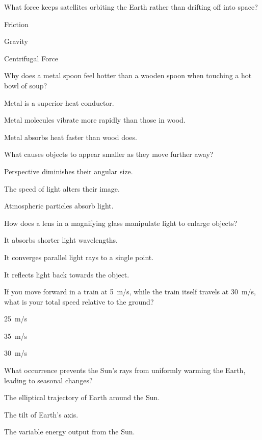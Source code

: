 \begin{enhancedmcq}{What force keeps satellites orbiting the Earth rather than drifting off into space?}
\item Friction
\item Gravity
\item Centrifugal Force

\end{enhancedmcq}
\begin{enhancedmcq}{Why does a metal spoon feel hotter than a wooden spoon when touching a hot bowl of soup?}
\item Metal is a superior heat conductor.
\item Metal molecules vibrate more rapidly than those in wood.
\item Metal absorbs heat faster than wood does.

\end{enhancedmcq}
\begin{enhancedmcq}{What causes objects to appear smaller as they move further away?}
\item Perspective diminishes their angular size.
\item The speed of light alters their image.
\item Atmospheric particles absorb light.

\end{enhancedmcq}
\begin{enhancedmcq}{How does a lens in a magnifying glass manipulate light to enlarge objects?}
\item It absorbs shorter light wavelengths.
\item It converges parallel light rays to a single point.
\item It reflects light back towards the object.

\end{enhancedmcq}
\begin{enhancedmcq}{If you move forward in a train at 5 m/s, while the train itself travels at 30 m/s, what is your total speed relative to the ground?}
\item 25 m/s
\item 35 m/s
\item 30 m/s

\end{enhancedmcq}
\begin{enhancedmcq}{What occurrence prevents the Sun's rays from uniformly warming the Earth, leading to seasonal changes?}
\item The elliptical trajectory of Earth around the Sun.
\item The tilt of Earth's axis.
\item The variable energy output from the Sun.

\end{enhancedmcq}
